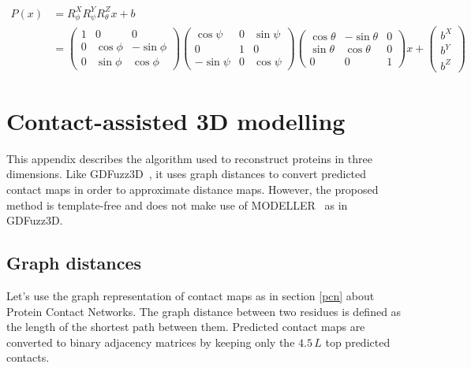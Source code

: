     \begin{align*}
        P(x) & = R^X_{\phi} R^Y_{\psi} R^Z_{\theta} x + b \\
        & =
        \begin{pmatrix}
        1 & 0 & 0 \\
        0 & \cos{\phi} & -\sin{\phi} \\
        0 & \sin{\phi} & \cos{\phi}
        \end{pmatrix}
        \begin{pmatrix}
        \cos{\psi} & 0 & \sin{\psi} \\
        0 & 1 & 0 \\
        -\sin{\psi} & 0 & \cos{\psi}
        \end{pmatrix}
        \begin{pmatrix}
        \cos{\theta} & -\sin{\theta} & 0 \\
        \sin{\theta} & \cos{\theta} & 0 \\
        0 & 0 & 1
        \end{pmatrix}
        x +
        \begin{pmatrix}
        b^X \\
        b^Y \\
        b^Z
        \end{pmatrix}
    \end{align*}

\section{Contact-assisted 3D modelling}

    This appendix describes the algorithm used to reconstruct
    proteins in three dimensions. Like GDFuzz3D~\cite{pietal2015gdfuzz3d},
    it uses graph distances to convert predicted contact maps
    in order to approximate distance maps. However, the proposed method is template-free
    and does not make use of MODELLER~\cite{modeller} as in GDFuzz3D.

  \subsection{Graph distances}

    Let's use the graph representation of contact maps as in section \ref{pcn}
    about Protein Contact Networks.
    The graph distance between two residues is defined as the length of
    the shortest path between them.
    Predicted contact maps are converted to binary adjacency matrices
    by keeping only the $4.5\,L$ top predicted contacts.

